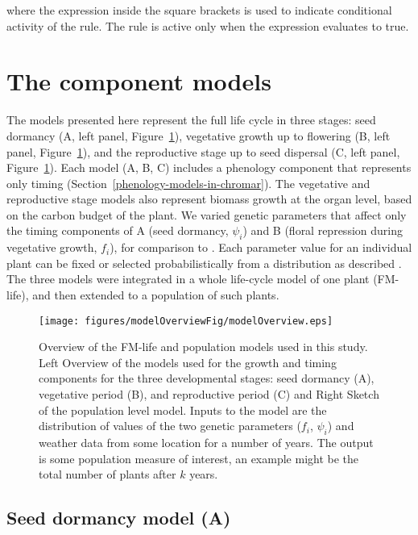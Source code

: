 where the expression inside the square brackets is used to indicate
conditional activity of the rule. The rule is active only when the
expression evaluates to true.

\section{The component models}
\label{sec:compModels}
The models presented here represent the full life cycle in three stages: seed
dormancy (A, left panel, Figure~\ref{fig:overview}), vegetative growth up to
flowering (B, left panel, Figure~\ref{fig:overview}), and the reproductive stage
up to seed dispersal (C, left panel, Figure~\ref{fig:overview}). Each model (A,
B, C) includes a phenology component that represents only timing
(Section~\ref{phenology-models-in-chromar}). The vegetative and reproductive
stage models also represent biomass growth at the organ level, based on the
carbon budget of the plant. We varied genetic parameters that affect only the
timing components of A (seed dormancy, \(\psi_{i}\)) and B (floral repression
during vegetative growth, \(f_{i}\)), for comparison to
\citet{burghardt_modeling_2015}.  Each parameter value for an individual plant
can be fixed or selected probabilistically from a distribution as described
\citep{burghardt_modeling_2015}. The three models were integrated in a whole
life-cycle model of one plant (FM-life), and then extended to a population of
such plants.

\begin{figure}[tb]
  \centering
\texttt{[image: figures/modelOverviewFig/modelOverview.eps]}
\caption{Overview of the FM-life and population models used in this study. Left
  Overview of the models used for the growth and timing components for the three
  developmental stages: seed dormancy (A), vegetative period (B), and
  reproductive period (C) and Right Sketch of the population level model. Inputs
  to the model are the distribution of values of the two genetic parameters
  (\(f_{i}\), \(\psi_{i}\)) and weather data from some location for a number of
  years. The output is some population measure of interest, an example might be
  the total number of plants after \(k\) years.}
\label{fig:overview}
\end{figure}

\subsection{Seed dormancy model (A)}
\label{seed-dormancy-model-a}

